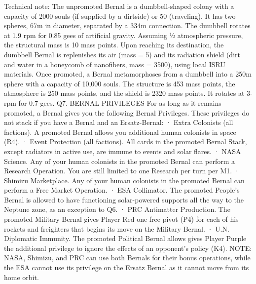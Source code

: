 \documentclass[a4paper]{book}
\begin{document}
Technical note: The unpromoted Bernal is a dumbbell-shaped colony with a capacity of 2000 souls (if supplied by a dirtside) or 50 (traveling). It has two spheres, 67m in diameter, separated by a 334m connection. The dumbbell rotates at 1.9 rpm for 0.85 gees of artificial gravity. Assuming ½ atmospheric pressure, the structural mass is 10 mass points. Upon reaching its destination, the dumbbell Bernal is replenishes its air (mass = 5) and its radiation shield (dirt and water in a honeycomb of nanofibers, mass = 3500), using local ISRU materials. Once promoted, a Bernal metamorphoses from a dumbbell into a 250m sphere with a capacity of 10,000 souls. The structure is 453 mass points, the atmosphere is 250 mass points, and the shield is 2320 mass points.  It rotates at 3-rpm for 0.7-gees.
Q7. BERNAL PRIVILEGES
For as long as it remains promoted, a Bernal gives you the following Bernal Privileges. These privileges do not stack if you have a Bernal and an Ersatz-Bernal:
·       Extra Colonists (all factions). A promoted Bernal allows you additional human colonists in space (R4).
·       Event Protection (all factions). All cards in the promoted Bernal Stack, except radiators in active use, are immune to events and solar flares.
·       NASA Science. Any of your human colonists in the promoted Bernal can perform a Research Operation. You are still limited to one Research per turn per M1.
·       Shimizu Marketplace. Any of your human colonists in the promoted Bernal can perform a Free Market Operation.
·       ESA Collimator. The promoted People’s Bernal is allowed to have functioning solar-powered supports all the way to the Neptune zone, as an exception to Q6.
·       PRC Antimatter Production. The promoted Military Bernal gives Player Red one free pivot (P4) for each of his rockets and freighters that begins its move on the Military Bernal.
·       U.N. Diplomatic Immunity. The promoted Political Bernal allows gives Player Purple the additional privilege to ignore the effects of an opponent’s policy (K4).
NOTE: NASA, Shimizu, and PRC can use both Bernals for their bonus operations, while the ESA cannot use its privilege on the Ersatz Bernal as it cannot move from its home orbit.
\end{document}
